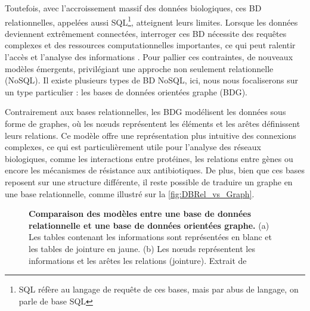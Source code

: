 Toutefois, avec l’accroissement massif des données biologiques, ces BD relationnelles, appelées aussi SQL\footnote{SQL réfère au langage de requête de ces bases, mais par abus de langage, on parle de base SQL}, atteignent leurs limites. Lorsque les données deviennent extrêmement connectées, interroger ces BD nécessite des requêtes complexes et des ressources computationnelles importantes, ce qui peut ralentir l’accès et l’analyse des informations \cite{hsu_correlation_2014}. Pour pallier ces contraintes, de nouveaux modèles émergents, privilégiant une approche non seulement relationnelle (NoSQL). Il existe plusieurs types de BD NoSQL, ici, nous nous focaliserons sur un type particulier : les bases de données orientées graphe (BDG).

Contrairement aux bases relationnelles, les BDG modélisent les données sous forme de graphes, où les n\oe uds représentent les éléments et les arêtes définissent leurs relations. Ce modèle offre une représentation plus intuitive des connexions complexes, ce qui est particulièrement utile pour l’analyse des réseaux biologiques, comme les interactions entre protéines, les relations entre gènes ou encore les mécanismes de résistance aux antibiotiques. De plus, bien que ces bases reposent sur une structure différente, il reste possible de traduire un graphe en une base relationnelle, comme illustré sur la \autoref{fig:DBRel_vs_Graph}.

\begin{figure}[htbp]
    \centering
    \hfill
    \caption[Comparaison des modèles entre une base de données relationnelle et une base de données orientées graphe]{\textbf{Comparaison des modèles entre une base de données relationnelle et une base de données orientées graphe.} (a) Les tables contenant les informations sont représentées en blanc et les tables de jointure en jaune. (b) Les n\oe uds représentent les informations et les arêtes les relations (jointure). Extrait de \cite{timon-reina_overview_2021}}
    \label{fig:DBRel_vs_Graph}
\end{figure}


